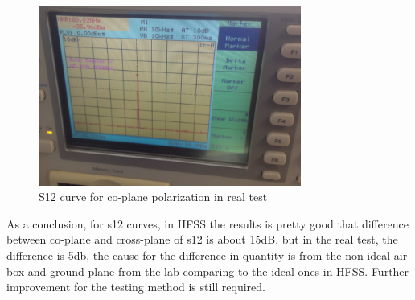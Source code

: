 \begin{figure}[h]
	\begin{center}
		\includegraphics[width=3.4in]{./images/efield_image12.png}
		\caption{S12 curve for co-plane polarization in real test}
		\label{fig:efield_fig14}
	\end{center}
\end{figure}

\clearpage

As a conclusion, for s12 curves, in HFSS the results is pretty good that difference between co-plane and cross-plane of s12 is about 15dB, but in the real test, the difference is 5db, the cause for the difference in quantity is from the non-ideal air box and ground plane from the lab comparing to the ideal ones in HFSS. Further improvement for the testing method is still required.



